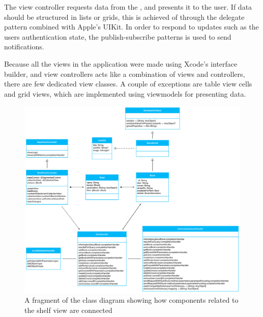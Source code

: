 The view controller requests data from the , and presents it to the user. If data should be structured in lists or grids, this is achieved  of through the delegate pattern combined with Apple's UIKit.\cite{progark}\cite{uikit} In order to respond to updates such as the users authentication state, the publish-subscribe patterns is used to send notifications.\cite{progark}

Because all the views in the application were made using Xcode's interface builder, and view controllers acts like a combination of views and controllers, there are few dedicated view classes. A couple of exceptions are table view cells and grid views, which are implemented using  viewmodels for presenting data.

\begin{figure}
    \includegraphics[width=\textwidth,keepaspectratio,origin=c]{figs/v06/iOS/shelf-class-diagram.png}
    \caption{A fragment of the class diagram showing how components related to the shelf view are connected}
    \label{fig:ios-shelf-class-diagram-6}
\end{figure}

